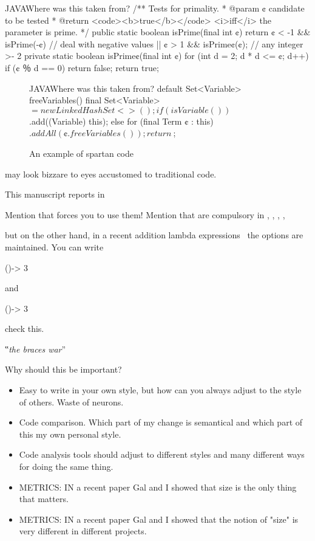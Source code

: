 \begin{Code}{JAVA}{Where was this taken from?}
/** Tests for primality.
  * @param ¢ candidate to be tested
  * @return <code><b>true</b></code> <i>iff</i> the parameter is prime. */
public static boolean isPrime(final int ¢) {
  return ¢ < -1 && isPrime(-¢) // deal with negative values
      || ¢ > 1 && isPrime¢(¢); // any integer >- 2
}
private static boolean isPrime¢(final int ¢) {
  for (int d = 2; d * d <= ¢; d++)
    if (¢ ％ d == 0)
      return false;
  return true;
}
\end{Code}
\begin{figure}[h]
  \begin{Code}{JAVA}{Where was this taken from?}
default Set<Variable> freeVariables() {
    final Set<Variable>~$ = new LinkedHashSet<>();
    if (isVariable())
~$.add((Variable) this);
    else
      for (final Term ¢ : this)
~$.addAll(¢.freeVariables());
    return~$;
  }
\end{Code}
\label{figure:shock-3}
\caption{An example of spartan code}
\end{figure}

may look bizzare to eyes accustomed to traditional \Java code.

This manuscript reports in

Mention that \Go forces you to use them!
Mention that are compulsory in ,
,
,
,

but on the other hand, in a recent addition lambda expressions~\cite{lambda}
the options are maintained.
You can write
\begin{JAVA}
()-> 3
\end{JAVA}
and
\begin{JAVA}
  ()-> {3}
\end{JAVA}
check this.

‟\emph{the braces war}”

Why should this be important?
\begin{itemize}
    \item Easy to write in your own style, but how can
      you always adjust to the style of others.
      Waste of neurons.
    \item Code comparison. Which part of my change is semantical and which
      part of this my own personal style.
    \item Code analysis tools should adjust to different styles and many
        different ways for doing the same thing.
    \item METRICS: IN a recent paper Gal and I showed that size
      is the only thing that matters.
    \item METRICS: IN a recent paper Gal and I showed that the notion of
      "size" is very different in different projects.
\end{itemize}

